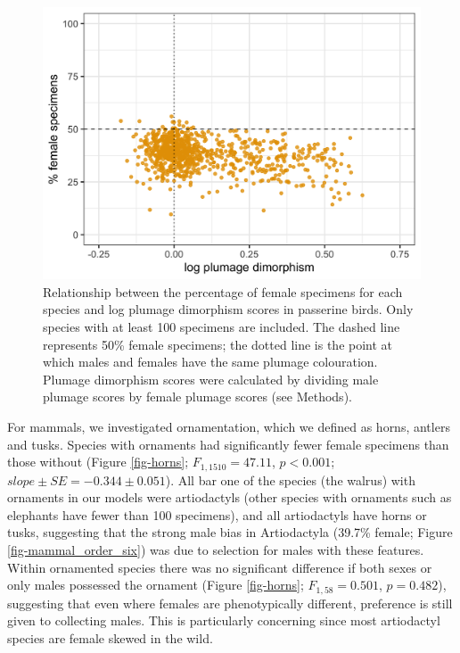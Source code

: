 \documentclass[a4paper, 12pt]{article}
\begin{document}
\begin{figure}
 \centering
  \includegraphics[width = \linewidth]{figures/plumage.png}
  \caption{Relationship between the percentage of female specimens for each species and log plumage dimorphism scores in passerine birds. 
  Only species with at least 100 specimens are included. 
  The dashed line represents 50\% female specimens; the dotted line is the point at which males and females have the same plumage colouration. 
  Plumage dimorphism scores were calculated by dividing male plumage scores by female plumage scores (see Methods). 
}
  \label{fig-plumage}
\end{figure}

For mammals, we investigated ornamentation, which we defined as horns, antlers and tusks. 
Species with ornaments had significantly fewer female specimens than those without (Figure \ref{fig-horns}; $F_{1, 1510} = 47.11$, $p < 0.001$; $slope \pm SE = -0.344 \pm 0.051$). 
All bar one of the species (the walrus) with ornaments in our models were artiodactyls (other species with ornaments such as elephants have fewer than 100 specimens), and all artiodactyls have horns or tusks, suggesting that the strong male bias in Artiodactyla (39.7\% female; Figure \ref{fig-mammal_order_six}) was due to selection for males with these features. 
Within ornamented species there was no significant difference if both sexes or only males possessed the ornament (Figure \ref{fig-horns}; $F_{1, 58} = 0.501$, $p = 0.482$), suggesting that even where females are phenotypically different, preference is still given to collecting males. 
This is particularly concerning since most artiodactyl species are female skewed in the wild\cite{berger1999sex}. 
\end{document}
